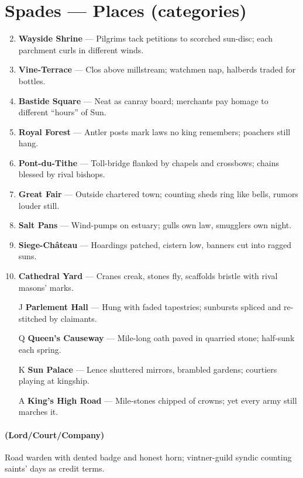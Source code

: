 \section*{Spades --- Places (categories)}
\label{sec:vhasia-places}
\begin{enumerate}
\setcounter{enumi}{1}
\item \textbf{Wayside Shrine} --- Pilgrims tack petitions to scorched sun-disc; each parchment curls in different winds.
\item \textbf{Vine-Terrace} --- Clos above millstream; watchmen nap, halberds traded for bottles.
\item \textbf{Bastide Square} --- Neat as canray board; merchants pay homage to different ``hours'' of Sun.
\item \textbf{Royal Forest} --- Antler posts mark laws no king remembers; poachers still hang.
\item \textbf{Pont-du-Tithe} --- Toll-bridge flanked by chapels and crossbows; chains blessed by rival bishops.
\item \textbf{Great Fair} --- Outside chartered town; counting sheds ring like bells, rumors louder still.
\item \textbf{Salt Pans} --- Wind-pumps on estuary; gulls own law, smugglers own night.
\item \textbf{Siege-Château} --- Hoardings patched, cistern low, banners cut into ragged suns.
\item \textbf{Cathedral Yard} --- Cranes creak, stones fly, scaffolds bristle with rival masons' marks.
\item[J] \textbf{Parlement Hall} --- Hung with faded tapestries; sunbursts spliced and re-stitched by claimants.
\item[Q] \textbf{Queen's Causeway} --- Mile-long oath paved in quarried stone; half-sunk each spring.
\item[K] \textbf{Sun Palace} --- Lence shuttered mirrors, brambled gardens; courtiers playing at kingship.
\item[A] \textbf{King's High Road} --- Mile-stones chipped of crowns; yet every army still marches it.
\end{enumerate}

\paragraph*{(Lord/Court/Company)} Road warden with dented badge and honest horn; vintner-guild syndic counting saints' days as credit terms.

